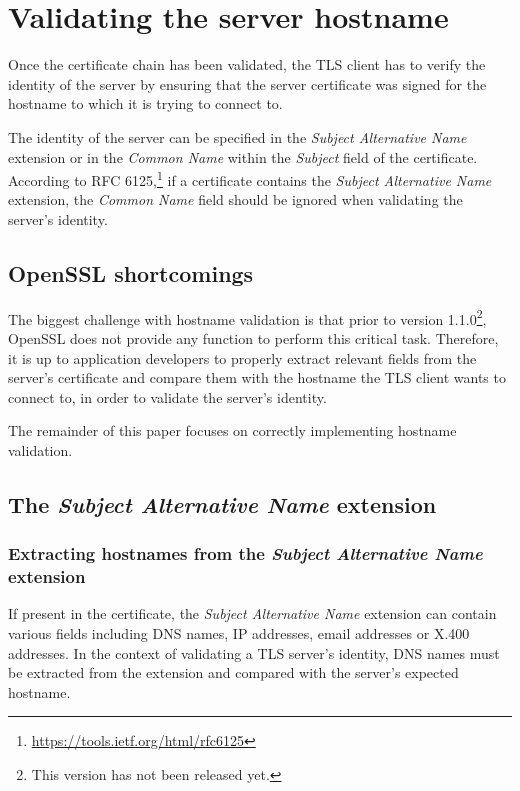 \documentclass{article}
\begin{document}
\section{Validating the server hostname}
\label{sec:hostname}
Once the certificate chain has been validated, the TLS client has to verify
the identity of the server by ensuring that the server certificate was signed
for the hostname to which it is trying to connect to. 

The identity of the server can be specified in the {\em Subject Alternative
Name} extension or in the {\em Common Name} within the {\em Subject} field of
the certificate. According to RFC
6125,\footnote{\url{https://tools.ietf.org/html/rfc6125}} if a certificate
contains the {\em Subject Alternative Name} extension, the {\em Common Name}
field should be ignored when validating the server's identity.


\subsection{OpenSSL shortcomings}

The biggest challenge with hostname validation is that prior to version
1.1.0\footnote{This version has not been released yet.}, OpenSSL does not
provide any function to perform this critical task. Therefore, it is up to
application developers to properly extract relevant fields from the server's
certificate and compare them with the hostname the TLS client wants to connect
to, in order to validate the server's identity.

The remainder of this paper focuses on correctly implementing hostname
validation.
\subsection{The {\em Subject Alternative Name} extension}

\subsubsection{Extracting hostnames from the {\em Subject Alternative Name} 
    extension}

If present in the certificate, the {\em Subject Alternative Name} extension
can contain various fields including DNS names, IP addresses, email addresses
or X.400 addresses. In the context of validating a TLS server's identity, DNS
names must be extracted from the extension and compared with the server's
expected hostname.
\end{document}
